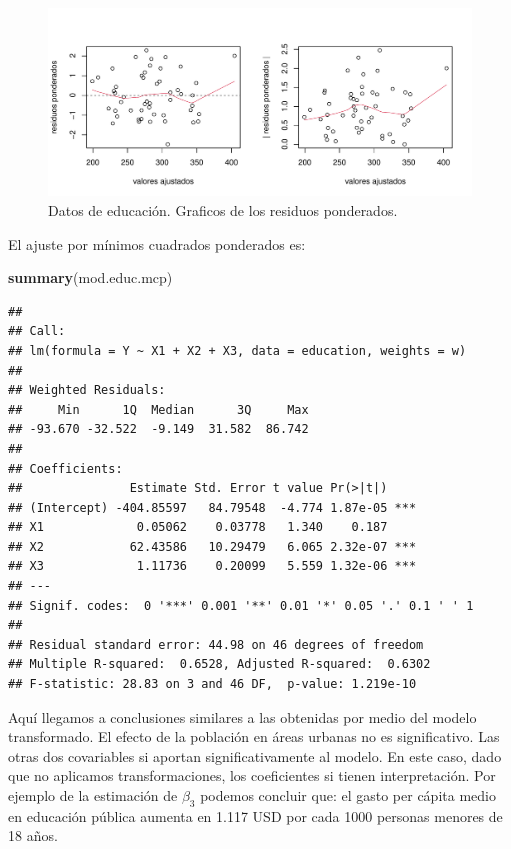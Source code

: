 \documentclass[
]{article}
\newenvironment{Shaded}{\begin{snugshade}}{\end{snugshade}}
\newcommand{\FunctionTok}[1]{\textcolor[rgb]{0.13,0.29,0.53}{\textbf{#1}}}
\newcommand{\NormalTok}[1]{#1}
\begin{document}
\begin{figure}

{\centering \includegraphics{MLG1_files/figure-latex/EducMCPFig-1} 

}

\caption{Datos de educación. Graficos de los residuos ponderados.}\label{fig:EducMCPFig}
\end{figure}

El ajuste por mínimos cuadrados ponderados es:

\begin{Shaded}
\begin{Highlighting}[]
\FunctionTok{summary}\NormalTok{(mod.educ.mcp)}
\end{Highlighting}
\end{Shaded}

\begin{verbatim}
## 
## Call:
## lm(formula = Y ~ X1 + X2 + X3, data = education, weights = w)
## 
## Weighted Residuals:
##     Min      1Q  Median      3Q     Max 
## -93.670 -32.522  -9.149  31.582  86.742 
## 
## Coefficients:
##               Estimate Std. Error t value Pr(>|t|)    
## (Intercept) -404.85597   84.79548  -4.774 1.87e-05 ***
## X1             0.05062    0.03778   1.340    0.187    
## X2            62.43586   10.29479   6.065 2.32e-07 ***
## X3             1.11736    0.20099   5.559 1.32e-06 ***
## ---
## Signif. codes:  0 '***' 0.001 '**' 0.01 '*' 0.05 '.' 0.1 ' ' 1
## 
## Residual standard error: 44.98 on 46 degrees of freedom
## Multiple R-squared:  0.6528, Adjusted R-squared:  0.6302 
## F-statistic: 28.83 on 3 and 46 DF,  p-value: 1.219e-10
\end{verbatim}

Aquí llegamos a conclusiones similares a las obtenidas por medio del modelo transformado. El efecto de la población en áreas urbanas no es significativo. Las otras dos covariables si aportan significativamente al modelo. En este caso, dado que no aplicamos transformaciones, los coeficientes si tienen interpretación. Por ejemplo de la estimación de \(\beta_{3}\) podemos concluir que: el gasto per cápita medio en educación pública aumenta en 1.117 USD por cada 1000 personas menores de 18 años.
\end{document}

